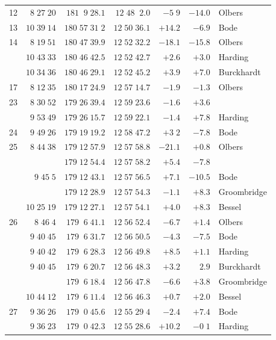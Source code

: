 \begin{longtable}{l|r|r|r|r|r|l}
12 & $8\;27\;20$ & $181\;\;9\;28.1$ & $12\;48\;\;2.0$ & $-5\;9$ & $-14.0$ & Olbers \\
13 & $10\;39\;14$ & $180\;57\;31\;2$ & $12\;50\;36.1$ & $+14.2$ & $-6.9$ & Bode \\
14 & $8\;19\;51$ & $180\;47\;39.9$ & $12\;52\;32.2$ & $-18.1$ & $-15.8$ & Olbers \\
 & $10\;43\;33$ & $180\;46\;42.5$ & $12\;52\;42.7$ & $+2.6$ & $+3.0$ & Harding \\
 & $10\;34\;36$ & $180\;46\;29.1$ & $12\;52\;45.2$ & $+3.9$ & $+7.0$ & Burckhardt \\
17 & $8\;12\;35$ & $180\;17\;24.9$ & $12\;57\;14.7$ & $-1.9$ & $-1.3$ & Olbers \\
23 & $8\;30\;52$ & $179\;26\;39.4$ & $12\;59\;23.6$ & $-1.6$ & $+3.6$ &  \\
 & $9\;53\;49$ & $179\;26\;15.7$ & $12\;59\;22.1$ & $-1.4$ & $+7.8$ & Harding \\
24 & $9\;49\;26$ & $179\;19\;19.2$ & $12\;58\;47.2$ & $+3\;2$ & $-7.8$ & Bode \\
25 & $8\;44\;38$ & $179\;12\;57.9$ & $12\;57\;58.8$ & $-21.1$ & $+0.8$ & Olbers \\
 &  & $179\;12\;54.4$ & $12\;57\;58.2$ & $+5.4$ & $-7.8$ &  \\
 & $9\;45\;5$ & $179\;12\;43.1$ & $12\;57\;56.5$ & $+7.1$ & $-10.5$ & Bode \\
 &  & $179\;12\;28.9$ & $12\;57\;54.3$ & $-1.1$ & $+8.3$ & Groombridge \\
 & $10\;25\;19$ & $179\;12\;27.1$ & $12\;57\;54.1$ & $+4.0$ & $+8.3$ & Bessel \\
26 & $8\;46\;4$ & $179\;\;6\;41.1$ & $12\;56\;52.4$ & $-6.7$ & $+1.4$ & Olbers \\
 & $9\;40\;45$ & $179\;\;6\;31.7$ & $12\;56\;50.5$ & $-4.3$ & $-7.5$ & Bode \\
 & $9\;40\;42$ & $179\;\;6\;28.3$ & $12\;56\;49.8$ & $+8.5$ & $+1.1$ & Harding \\
 & $9\;40\;45$ & $179\;\;6\;20.7$ & $12\;56\;48.3$ & $+3.2$ & $2.9$ & Burckhardt \\
 &  & $179\;\;6\;18.4$ & $12\;56\;47.8$ & $-6.6$ & $+3.8$ & Groombridge \\
 & $10\;44\;12$ & $179\;\;6\;11.4$ & $12\;56\;46.3$ & $+0.7$ & $+2.0$ & Bessel \\
27 & $9\;36\;26$ & $179\;\;0\;45.6$ & $12\;55\;29\;4$ & $-2.4$ & $+7.4$ & Bode \\
 & $9\;36\;23$ & $179\;\;0\;42.3$ & $12\;55\;28.6$ & $+10.2$ & $-0\;1$ & Harding \\

\end{longtable}
